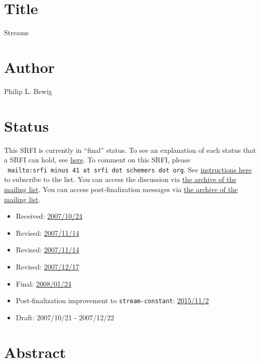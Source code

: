 \section{Title}\label{title}

Streams

\section{Author}\label{author}

Philip L. Bewig

\section{Status}\label{status}

This SRFI is currently in ``final'' status. To see an explanation of
each status that a SRFI can hold, see
\href{http://srfi.schemers.org/srfi-process.html}{here}. To comment on
this SRFI, please
\texttt{\ mailto:srfi\ minus\ 41\ at\ srfi\ dot\ schemers\ dot\ org}.
See
\href{http://srfi.schemers.org/srfi-list-subscribe.html}{instructions
here} to subscribe to the list. You can access the discussion via
\href{http://srfi.schemers.org/srfi-41/mail-archive/maillist.html}{the
archive of the mailing list}. You can access post-finalization messages
via
\href{http://srfi.schemers.org/srfi-41/post-mail-archive/maillist.html}{the
archive of the mailing list}.

\begin{itemize}
\tightlist
\item
  Received:
  \href{http://srfi.schemers.org/srfi-41/srfi-41-1.2.html}{2007/10/24}
\item
  Revised:
  \href{http://srfi.schemers.org/srfi-41/srfi-41-1.3.html}{2007/11/14}
\item
  Revised:
  \href{http://srfi.schemers.org/srfi-41/srfi-41-1.5.html}{2007/11/14}
\item
  Revised:
  \href{http://srfi.schemers.org/srfi-41/srfi-41-1.6.html}{2007/12/17}
\item
  Final:
  \href{http://srfi.schemers.org/srfi-41/srfi-41-1.7.html}{2008/01/24}
\item
  Post-finalization improvement to \texttt{stream-constant}:
  \href{http://srfi-email.schemers.org/srfi-41/dates/2015/10}{2015/11/2}
\item
  Draft: 2007/10/21 - 2007/12/22
\end{itemize}

\section{Abstract}\label{abstract}

